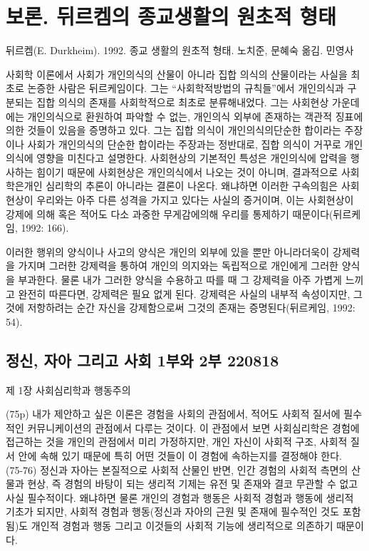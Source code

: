 \documentclass[12pt, a4paper]{article}
\begin{document}
\newpage

\section{보론. 뒤르켐의 종교생활의 원초적 형태}
뒤르켐(E. Durkheim). 1992. 종교 생활의 원초적 형태. 노치준, 문혜숙 옮김. 민영사

사회학 이론에서 사회가 개인의식의 산물이 아니라 집합 의식의 산물이라는 사실을 최초로 논증한 사람은 뒤르케임이다. 그는 ``사회학적방법의 규칙들''에서 개인의식과 구분되는 집합 의식의 존재를 사회학적으로 최초로 분류해내었다. 그는 사회현상 가운데에는 개인의식으로 환원하여 파악할 수 없는, 개인의식 외부에 존재하는 객관적 징표에 의한 것들이 있음을 증명하고 있다. 그는 집합 의식이 개인의식의단순한 합이라는 주장이나 사회가 개인의식의 단순한 합이라는 주장과는 정반대로, 집합 의식이 거꾸로 개인의식에 영향을 미친다고 설명한다. 사회현상의 기본적인 특성은 개인의식에 압력을 행사하는 힘이기 때문에 사회현상은 개인의식에서 나오는 것이 아니며, 결과적으로 사회학은개인 심리학의 추론이 아니라는 결론이 나온다. 왜냐하면 이러한 구속의힘은 사회현상이 우리와는 아주 다른 성격을 가지고 있다는 사실의 증거이며, 이는 사회현상이 강제에 의해 혹은 적어도 다소 과중한 무게감에의해 우리를 통제하기 때문이다(뒤르케임, 1992: 166).

이러한 행위의 양식이나 사고의 양식은 개인의 외부에 있을 뿐만 아니라더욱이 강제력을 가지며 그러한 강제력을 통하여 개인의 의지와는 독립적으로 개인에게 그러한 양식을 부과한다. 물론 내가 그러한 양식을 수용하고 따를 때 그 강제력을 아주 가볍게 느끼고 완전히 따른다면, 강제력은 필요 없게 된다. 강제력은 사실의 내부적 속성이지만, 그것에 저항하려는 순간 자신을 강제함으로써 그것의 존재는 증명된다(뒤르케임, 1992: 54).

\newpage
\subsection{정신, 자아 그리고 사회 1부와 2부 220818}

제 1장 사회심리학과 행동주의

(75p) 내가 제안하고 싶은 이론은 경험을 사회의 관점에서, 적어도 사회적 질서에 필수적인 커뮤니케이션의 관점에서 다루는 것이다. 이 관점에서 보면 사회심리학은 경험에 접근하는 것을 개인의 관점에서 미리 가정하지만, 개인 자신이 사회적 구조, 사회적 질서 안에 속해 있기 때문에 특히 어떤 것들이 이 경험에 속하는지를 결정해야 한다. \\

(75-76) 정신과 자아는 본질적으로 사회적 산물인 반면, 인간 경험의 사회적 측면의 산물과 현상, 즉 경험의 바탕이 되는 생리적 기제는 유전 및 존재와 결코 무관할 수 없고 사실 필수적이다. 왜냐하면 물론 개인의 경험과 행동은 사회적 경험과 행동에 생리적 기초가 되지만, 사회적 경험과 행동(정신과 자아의 근원 및 존재에 필수적인 것도 포함됨)도 개인적 경험과 행동 그리고 이것들의 사회적 기능에 생리적으로 의존하기 때문이다. 
\end{document}
